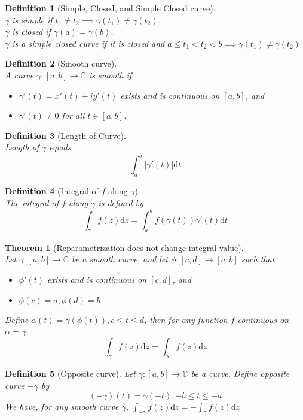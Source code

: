 \documentclass[12pt]{article}
\newcommand{\diff}{\mathrm{d}}
\newtheorem{definition}{Definition}[section]
\newtheorem{theorem}{Theorem}[section]
\theoremstyle{definition}
\begin{document}
\begin{definition}[Simple, Closed, and Simple Closed curve]
\hfill\\\normalfont $\gamma$ is simple if $t_1\neq t_2 \implies \gamma(t_1)\neq \gamma(t_2)$.\\
$\gamma$ is closed if $\gamma(a) = \gamma(b)$.\\
$\gamma$ is a simple closed curve if it is closed and $a\leq t_1 < t_2 < b \implies \gamma(t_1) \neq \gamma(t_2)$
\end{definition}
\begin{definition}[Smooth curve]
\hfill\\\normalfont A curve $\gamma:[a,b]\to\mathbb{C}$ is smooth if 
\begin{itemize}
	\item $\gamma'(t)=x'(t)+iy'(t)$ exists and is continuous on $[a,b]$, and
	\item $\gamma'(t)\neq 0$ for all $t\in [a,b]$.
\end{itemize}
\end{definition}
\begin{definition}[Length of Curve]
\hfill\\\normalfont Length of $\gamma$ equals 
\[
\int_a^b |\gamma'(t)|\diff t
\]
\end{definition}
\begin{definition}[Integral of {$f$} along {$\gamma$}]
\hfill\\\normalfont The integral of $f$ along $\gamma$ is defined by
\[
\int_\gamma f(z)\diff z = \int_a^b f(\gamma(t))\gamma'(t)\diff t
\]
\end{definition}
\begin{theorem}[Reparametrization does not change integral value]
\hfill\\\normalfont Let $\gamma:[a,b]\to\mathbb{C}$ be a smooth curve, and let $\phi:[c,d]\to [a,b]$ such that 
\begin{itemize}
	\item $\phi'(t)$ exists and is continuous on $[c,d]$, and
	\item $\phi(c) = a, \phi(d) = b$
\end{itemize}
Define $\alpha(t)=\gamma(\phi(t)), c\leq t \leq d$, then for any function $f$ continuous on $\alpha = \gamma$,
\[
\int_\gamma f(z)\diff z = \int_\alpha f(z)\diff z
\]
\end{theorem}
\begin{definition}[Opposite curve]
Let $\gamma:[a,b]\to\mathbb{C}$ be a curve. Define opposite curve $-\gamma$ by
\[
(-\gamma)(t)=\gamma(-t), -b\leq t\leq -a
\]
We have, for any smooth curve $\gamma$, $\int_{-\gamma}f(z)\diff z = -\int_\gamma f(z)\diff z$
\end{definition}
\end{document}
